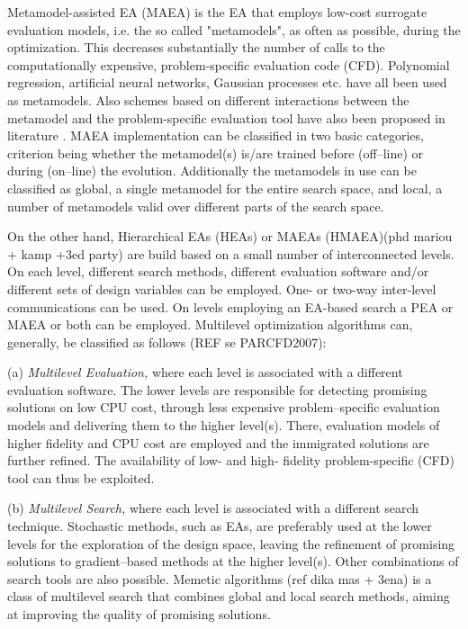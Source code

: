Metamodel-assisted EA (MAEA) is the EA that employs low-cost surrogate evaluation models, i.e. the so called "metamodels", as often as possible, during the optimization. This decreases substantially the number of calls to the computationally expensive, problem-specific evaluation code (CFD). Polynomial regression, artificial neural networks, Gaussian processes etc. have all been used as metamodels. Also schemes based on different interactions between the metamodel and the problem-specific evaluation tool have also been proposed in literature \cite{KEANEbook,LTT_2_020,Jin2002,LTT_2_027}. MAEA implementation can be classified in two basic categories, criterion being whether the metamodel(s) is/are trained before (off–line) or during (on–line) the evolution. Additionally the metamodels in use can be classified as global, a single metamodel for the entire search space, and local, a number of metamodels valid over different parts of the search space.
  

On the other hand, Hierarchical EAs (HEAs) or MAEAs (HMAEA)(phd mariou + kamp +3ed party) are build based on a small number of interconnected levels. On each level, different search methods, different evaluation software and/or different sets of design variables can be employed. One- or two-way inter-level communications can be used. On levels employing an EA-based search a PEA or MAEA or both can be employed. Multilevel optimization algorithms can, generally, be classified as follows (REF se PARCFD2007):

(a) \emph{Multilevel Evaluation,} where each level is associated with
a different evaluation software. The lower levels are responsible
for detecting promising solutions  on low CPU cost, through less
expensive problem--specific evaluation models and
delivering them to the higher level(s). There, evaluation models of
higher fidelity and CPU cost are employed and the immigrated
solutions are further refined. The availability of low- and  high- fidelity problem-specific (CFD) tool can thus be exploited.

(b) \emph{Multilevel Search,} where each level is associated with a
different search technique. Stochastic methods, such as EAs, are
preferably used at the lower levels for the exploration of the
design space, leaving the refinement of promising solutions to
gradient--based methods at the higher level(s). Other
combinations of search tools are also possible. Memetic algorithms (ref dika mas + 3ena) is a class of multilevel search that combines global and local search methods, aiming at improving the quality of
promising solutions.


